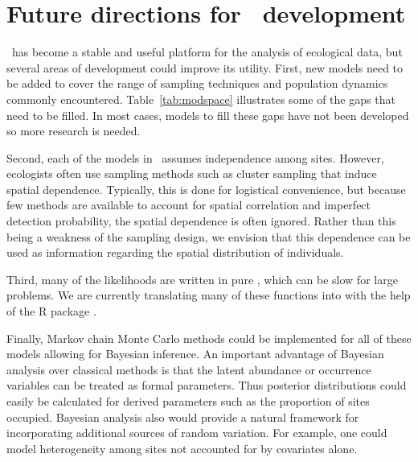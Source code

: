 \documentclass[article,shortnames]{jss}
\newcommand{\um}{\pkg{unmarked}}
\newcommand{\rlang}{\proglang{R}}
\begin{document}
{\section[Future directions for unmarked development]{Future directions for \um\ development}
\label{sec:future-direct-unmark}

\um\ has become a stable and useful platform for the analysis of ecological 
data, but several areas of development could improve its utility.  First, new 
models need to be added to cover the range of sampling techniques and 
population dynamics commonly encountered. Table~\ref{tab:modspace} illustrates 
some of the gaps that need to be filled. In most cases, models to fill these 
gaps have not been developed so more research is needed.  


Second, each of the models in \um\ assumes independence among sites. However, 
ecologists often use sampling methods such as cluster sampling that induce 
spatial dependence. Typically, this is done for logistical convenience, but 
because few methods are available to account for spatial correlation and 
imperfect detection probability, the spatial dependence is often ignored.  
Rather than this being a weakness of the sampling design, we envision that 
this dependence can be used as information regarding the spatial distribution
of individuals.  

Third, many of the likelihoods are written in pure \rlang, which can be 
slow for large problems. We are currently translating many of these
functions into  with the help of the R package  
\citep{Rcpp11}.

Finally, Markov chain Monte Carlo methods could be implemented for all 
of these models allowing for Bayesian inference.  An 
important advantage of Bayesian analysis over classical methods is that the 
latent abundance or occurrence variables can be treated as formal parameters.  
Thus posterior distributions could easily be calculated for derived parameters 
such as the proportion of sites occupied.  Bayesian analysis also would provide 
a natural framework for incorporating additional sources of random variation.  
For example, one could model heterogeneity among sites not accounted for by 
covariates alone.  

}
\end{document}
